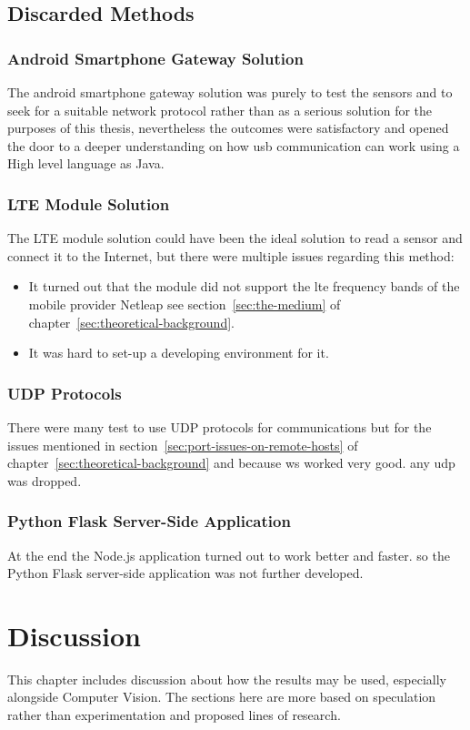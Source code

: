 \documentclass[hidelinks,11pt,a4paper,oneside,article]{memoir}
\begin{document}
\section{Discarded Methods}

\subsection*{Android Smartphone Gateway Solution}
The android smartphone gateway solution was purely to test the sensors and to seek for a suitable network protocol rather than as a serious solution for the purposes of this thesis, nevertheless the outcomes were satisfactory and opened the door to a deeper understanding on how \gls{usb} communication can work using a High level language as Java.

\subsection*{LTE Module Solution}
The LTE module solution could have been the ideal solution to read a sensor and connect it to the Internet, but there were multiple issues regarding this method:
\begin{itemize}
    \item It turned out that the module did not support the \gls{lte} frequency bands of the mobile provider Netleap see section~\ref{sec:the-medium} of chapter~\ref{sec:theoretical-background}.
    \item It was hard to set-up a developing environment for it.
\end{itemize} 

\subsection*{UDP Protocols}
There were many test to use UDP protocols for communications but for the issues mentioned in section~\ref{sec:port-issues-on-remote-hosts} of chapter~\ref{sec:theoretical-background} and because \gls{ws} worked very good. any \gls{udp} was dropped.

\subsection*{Python Flask Server-Side Application}
At the end the Node.js application turned out to work better and faster. so the Python Flask  server-side application was not further developed.


\clearpage\chapter{Discussion}\label{sec:discussion}
This chapter includes discussion about how the results may be used, especially alongside Computer Vision. The sections here are more based on speculation rather than experimentation and proposed lines of research.
\end{document}
